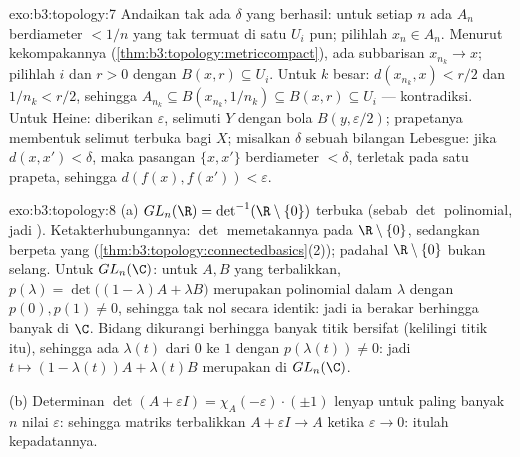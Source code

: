 \begin{solution}{exo:b3:topology:7}
Andaikan tak ada $\delta$ yang berhasil: untuk setiap $n$ ada $A_n$ berdiameter
$< 1/n$ yang tak termuat di satu $U_i$ pun; pilihlah $x_n \in
A_n$. Menurut kekompakannya (\cref{thm:b3:topology:metriccompact}),
ada subbarisan $x_{n_k} \to x$; pilihlah $i$ dan $r > 0$ dengan $B(x,
r) \subseteq U_i$. Untuk $k$ besar: $d(x_{n_k}, x) < r/2$ dan
$1/n_k < r/2$, sehingga $A_{n_k} \subseteq B(x_{n_k}, 1/n_k)
\subseteq B(x, r) \subseteq U_i$ --- kontradiksi. Untuk Heine:
diberikan $\varepsilon$, selimuti $Y$ dengan bola $B(y, \varepsilon/2)$;
prapetanya membentuk selimut terbuka bagi $X$; misalkan $\delta$ sebuah
bilangan Lebesgue: jika $d(x, x') < \delta$, maka pasangan $\{x, x'\}$
berdiameter $< \delta$, terletak pada satu prapeta, sehingga $d(f(x),
f(x')) < \varepsilon$.
\end{solution}

\begin{solution}{exo:b3:topology:8}
(a) $GL_n(\R) = \det^{-1}(\R\setminus\{0\})$ terbuka (sebab $\det$
polinomial, jadi ). Ketakterhubungannya: $\det$ memetakannya pada
$\R\setminus\{0\}$, sedangkan  berpeta  yang
 (\cref{thm:b3:topology:connectedbasics}(2)); padahal
$\R\setminus\{0\}$ bukan selang. Untuk $GL_n(\C)$: untuk $A, B$
yang terbalikkan, $p(\lambda) = \det\bigl((1-\lambda)A + \lambda
B\bigr)$ merupakan polinomial dalam $\lambda$ dengan $p(0), p(1) \neq 0$,
sehingga tak nol secara identik: jadi ia berakar berhingga banyak di $\C$.
Bidang dikurangi berhingga banyak titik bersifat  (kelilingi
titik itu), sehingga ada  $\lambda(t)$
dari $0$ ke $1$ dengan $p(\lambda(t)) \neq 0$: jadi $t \mapsto
(1-\lambda(t))A + \lambda(t)B$ merupakan  di $GL_n(\C)$.

(b) Determinan $\det(A + \varepsilon I) = \chi_A(-\varepsilon)\cdot(\pm1)$
lenyap untuk paling banyak $n$ nilai $\varepsilon$: sehingga matriks terbalikkan
$A + \varepsilon I \to A$ ketika $\varepsilon \to 0$: itulah
kepadatannya.
\end{solution}

